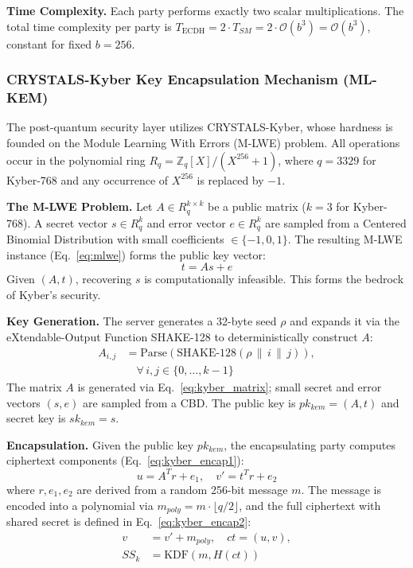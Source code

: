 \documentclass[journal, 10pt, twocolumn]{IEEEtran}
\begin{document}
\textbf{Time Complexity.} Each party performs exactly two scalar multiplications. The total time complexity per party is $T_{\text{ECDH}} = 2 \cdot T_{SM} = 2 \cdot \mathcal{O}(b^3) = \mathcal{O}(b^3)$, constant for fixed $b = 256$.

\subsubsection{CRYSTALS-Kyber Key Encapsulation Mechanism (ML-KEM)}
The post-quantum security layer utilizes CRYSTALS-Kyber, whose hardness is founded on the Module Learning With Errors (M-LWE) problem. All operations occur in the polynomial ring $R_q = \mathbb{Z}_q[X]/(X^{256}+1)$, where $q = 3329$ for Kyber-768 and any occurrence of $X^{256}$ is replaced by $-1$.

\textbf{The M-LWE Problem.} Let $A \in R_q^{k \times k}$ be a public matrix ($k = 3$ for Kyber-768). A secret vector $s \in R_q^k$ and error vector $e \in R_q^k$ are sampled from a Centered Binomial Distribution with small coefficients $\in \{-1, 0, 1\}$. The resulting M-LWE instance (Eq.~\eqref{eq:mlwe}) forms the public key vector:
\begin{equation}
t = As + e
\label{eq:mlwe}
\end{equation}
Given $(A, t)$, recovering $s$ is computationally infeasible. This forms the bedrock of Kyber's security.

\textbf{Key Generation.} The server generates a 32-byte seed $\rho$ and expands it via the eXtendable-Output Function SHAKE-128 to deterministically construct $A$:
\begin{equation}
\begin{split}
A_{i,j} &= \text{Parse}(\text{SHAKE-128}(\rho \,\|\, i \,\|\, j)), \\
& \quad \forall\, i,j \in \{0, \ldots, k-1\}
\end{split}
\label{eq:kyber_matrix}
\end{equation}
The matrix $A$ is generated via Eq.~\eqref{eq:kyber_matrix}; small secret and error vectors $(s, e)$ are sampled from a CBD. The public key is $pk_{kem} = (A, t)$ and secret key is $sk_{kem} = s$.

\textbf{Encapsulation.} Given the public key $pk_{kem}$, the encapsulating party computes ciphertext components (Eq.~\eqref{eq:kyber_encap1}):
\begin{equation}
u = A^T r + e_1, \quad v' = t^T r + e_2
\label{eq:kyber_encap1}
\end{equation}
where $r, e_1, e_2$ are derived from a random 256-bit message $m$. The message is encoded into a polynomial via $m_{poly} = m \cdot \lfloor q/2 \rfloor$, and the full ciphertext with shared secret is defined in Eq.~\eqref{eq:kyber_encap2}:
\begin{equation}
\begin{split}
v &= v' + m_{poly}, \quad ct = (u, v), \\
SS_k &= \text{KDF}(m, H(ct))
\end{split}
\label{eq:kyber_encap2}
\end{equation}
\end{document}

